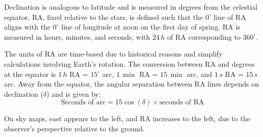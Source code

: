 Declination is analogous to latitude and is measured in degrees from the celestial equator. RA, fixed relative to the stars, is defined such that the $0^\circ$ line of RA aligns with the $0^\circ$ line of longitude at noon on the first day of spring. RA is measured in hours, minutes, and seconds, with $24\,h$ of RA corresponding to $360^\circ$.

The units of RA are time-based due to historical reasons and simplify calculations involving Earth's rotation. The conversion between RA and degrees at the equator is $1\,h$ RA = $15^\circ$ arc, $1\, \min$ RA = $15\, \min$ arc, and $1\,s$ RA = $15\,s$ arc. Away from the equator, the angular separation between RA lines depends on declination ($\delta$) and is given by:
\[
\text{Seconds of arc} = 15 \cos (\delta) \times \text{seconds of RA}
\]

On sky maps, east appears to the left, and RA increases to the left, due to the observer's perspective relative to the ground.

